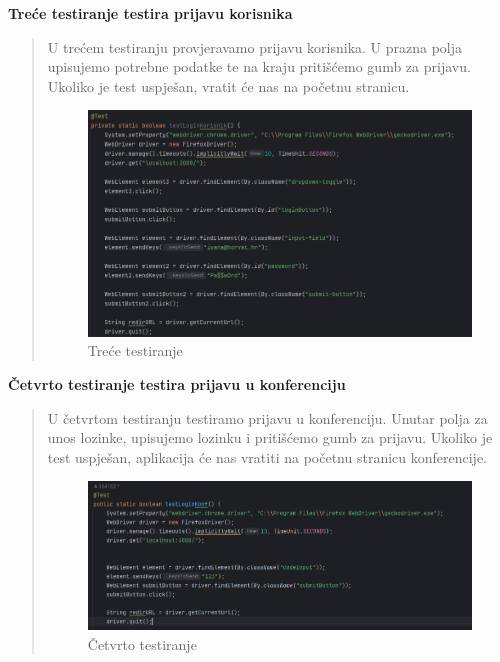 \begin{packed_enum}
				\item\textbf{Treće testiranje testira prijavu korisnika}
				\begin{quote}
					U trećem testiranju provjeravamo prijavu korisnika. U prazna polja upisujemo potrebne podatke te na kraju pritišćemo gumb za prijavu. Ukoliko je test uspješan, vratit će nas na početnu stranicu.
					\begin{figure}[H]
						\includegraphics[width=\textwidth]{slike/Selenium3.png} %
						\caption{Treće testiranje}
						\label{fig:Selenium3} %
					\end{figure}
				\end{quote}
				
				\item\textbf{Četvrto testiranje testira prijavu u konferenciju}
				\begin{quote}
					U četvrtom testiranju testiramo prijavu u konferenciju. Unutar polja za unos lozinke, upisujemo lozinku i pritišćemo gumb za prijavu. Ukoliko je test uspješan, aplikacija će nas vratiti na početnu stranicu konferencije.
					\begin{figure}[H]
						\includegraphics[width=\textwidth]{slike/Selenium4.png} %
						\caption{Četvrto testiranje}
						\label{fig:Selenium4} %
					\end{figure}
				\end{quote}
				
			\end{packed_enum}
			
